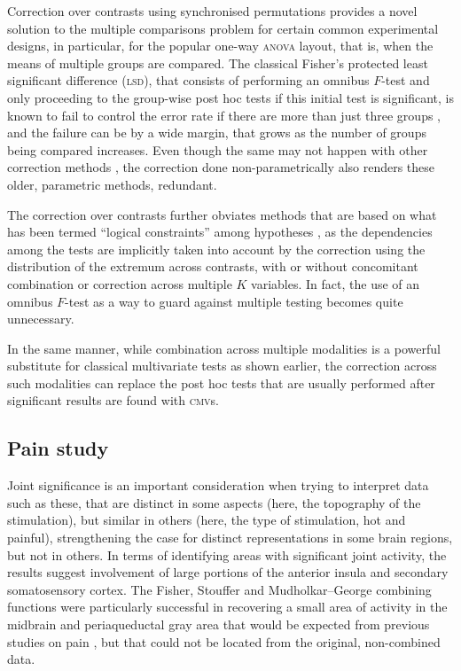 Correction over contrasts using synchronised permutations provides a novel solution to the multiple comparisons problem for certain common experimental designs, in particular, for the popular one-way \textsc{anova} layout, that is, when the means of multiple groups are compared. The classical Fisher's protected least significant difference (\textsc{lsd}), that consists of performing an omnibus $F$-test and only proceeding to the group-wise post hoc tests if this initial test is significant, is known to fail to control the error rate if there are more than just three groups \citep{Hayter1986, Hsu1996, Meier2006}, and the failure can be by a wide margin, that grows as the number of groups being compared increases. Even though the same may not happen with other correction methods \citep[e.g., Tukey's range test,][]{Tukey1949}, the correction done non-parametrically also renders these older, parametric methods, redundant.

The correction over contrasts further obviates methods that are based on what has been termed ``logical constraints'' among hypotheses \citep{Shaffer1986, Hochberg1987}, as the dependencies among the tests are implicitly taken into account by the correction using the distribution of the extremum across contrasts, with or without concomitant combination or correction across multiple $K$ variables. In fact, the use of an omnibus $F$-test as a way to guard against multiple testing becomes quite unnecessary.

In the same manner, while combination across multiple modalities is a powerful substitute for classical multivariate tests as shown earlier, the correction across such modalities can replace the post hoc tests that are usually performed after significant results are found with \textsc{cmv}s.

\subsection{Pain study}

Joint significance is an important consideration when trying to interpret data such as these, that are distinct in some aspects (here, the topography of the stimulation), but similar in others (here, the type of stimulation, hot and painful), strengthening the case for distinct representations in some brain regions, but not in others. In terms of identifying areas with significant joint activity, the results suggest involvement of large portions of the anterior insula and secondary somatosensory cortex. The Fisher, Stouffer and Mudholkar--George combining functions were particularly successful in recovering a small area of activity in the midbrain and periaqueductal gray area that would be expected from previous studies on pain \citep{Reynolds1969, Petrovic2002, Tracey2002, Roy2014}, but that could not be located from the original, non-combined data.

